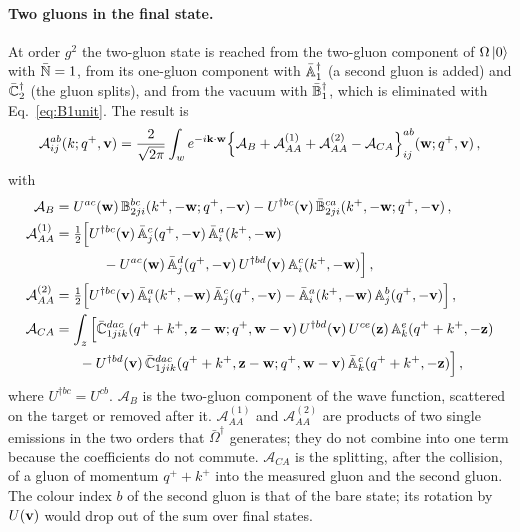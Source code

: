 \paragraph{Two gluons in the final state.} At order $g^2$ the two-gluon state is reached from the two-gluon component of $\Omega\ket0$ with $\bar{\mathbb{N}}=1$, from its one-gluon component with $\bar{\mathbb{A}}^\dagger_1$ (a second gluon is added) and $\bar{\mathbb{C}}_2^\dagger$ (the gluon splits), and from the vacuum with $\bar{\mathbb{B}}_1^\dagger$, which is eliminated with Eq.~\eqref{eq:B1unit}. The result is
\begin{align}\label{eq:A2gamp}
\mathcal A^{ab}_{ij}(k;q^+,\mathbf{v})=\frac{2}{\sqrt{2\pi}}\int_w e^{-i\mathbf{k}\cdot\mathbf{w}}\Big\{\mathcal A_B+\mathcal A^{(1)}_{AA}+\mathcal A^{(2)}_{AA}-\mathcal A_{CA}\Big\}^{ab}_{ij}(\mathbf{w};q^+,\mathbf{v})\,,
\end{align}
with
\begin{align}\label{eq:A2parts}
\mathcal A_B&=U^{ac}(\mathbf{w})\,\mathbb{B}^{bc}_{2ji}(k^+,-\mathbf{w};q^+,-\mathbf{v})-U^{\dagger bc}(\mathbf{v})\,\bar{\mathbb{B}}^{ca}_{2ji}(k^+,-\mathbf{w};q^+,-\mathbf{v})\,,
\notag\\
\mathcal A^{(1)}_{AA}&=\tfrac12\Big[U^{\dagger bc}(\mathbf{v})\,\bar{\mathbb{A}}^c_j(q^+,-\mathbf{v})\,\bar{\mathbb{A}}^a_i(k^+,-\mathbf{w})\notag\\&\hspace{1.2cm}-U^{ac}(\mathbf{w})\,\bar{\mathbb{A}}^d_j(q^+,-\mathbf{v})\,U^{\dagger bd}(\mathbf{v})\,\mathbb{A}^c_i(k^+,-\mathbf{w})\Big]\,,
\notag\\
\mathcal A^{(2)}_{AA}&=\tfrac12\Big[U^{\dagger bc}(\mathbf{v})\,\bar{\mathbb{A}}^a_i(k^+,-\mathbf{w})\,\bar{\mathbb{A}}^c_j(q^+,-\mathbf{v})-\bar{\mathbb{A}}^a_i(k^+,-\mathbf{w})\,\mathbb{A}^b_j(q^+,-\mathbf{v})\Big]\,,
\notag\\
\mathcal A_{CA}&=\int_z\Big[\bar{\mathbb{C}}^{dac}_{1jik}(q^++k^+,\mathbf{z}-\mathbf{w};q^+,\mathbf{w}-\mathbf{v})\,U^{\dagger bd}(\mathbf{v})\,U^{ce}(\mathbf{z})\,\mathbb{A}^e_k(q^++k^+,-\mathbf{z})
\notag\\&\hspace{0.6cm}
-U^{\dagger bd}(\mathbf{v})\,\bar{\mathbb{C}}^{dac}_{1jik}(q^++k^+,\mathbf{z}-\mathbf{w};q^+,\mathbf{w}-\mathbf{v})\,\bar{\mathbb{A}}^c_k(q^++k^+,-\mathbf{z})\Big]\,,
\end{align}
where $U^{\dagger bc}=U^{cb}$. $\mathcal A_B$ is the two-gluon component of the wave function, scattered on the target or removed after it. $\mathcal A^{(1)}_{AA}$ and $\mathcal A^{(2)}_{AA}$ are products of two single emissions in the two orders that $\bar\Omega^\dagger$ generates; they do not combine into one term because the coefficients do not commute. $\mathcal A_{CA}$ is the splitting, after the collision, of a gluon of momentum $q^++k^+$ into the measured gluon and the second gluon. The colour index $b$ of the second gluon is that of the bare state; its rotation by $U(\mathbf{v})$ would drop out of the sum over final states.

